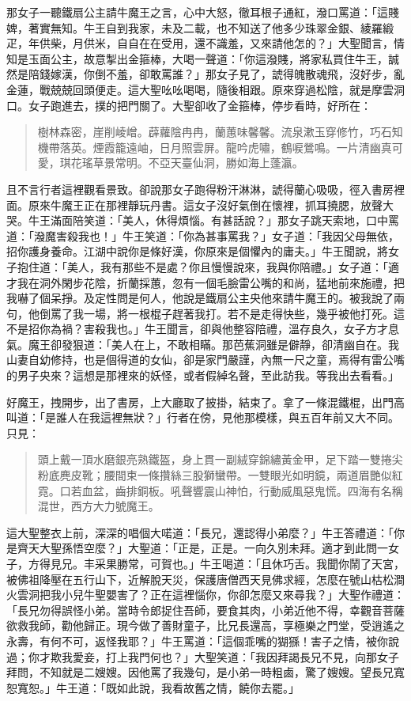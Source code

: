 那女子一聽鐵扇公主請牛魔王之言，心中大怒，徹耳根子通紅，潑口罵道：「這賤婢，著實無知。牛王自到我家，未及二載，也不知送了他多少珠翠金銀、綾羅緞疋，年供柴，月供米，自自在在受用，還不識羞，又來請他怎的？」大聖聞言，情知是玉面公主，故意掣出金箍棒，大喝一聲道：「你這潑賤，將家私買住牛王，誠然是陪錢嫁漢，你倒不羞，卻敢罵誰？」那女子見了，諕得魄散魂飛，沒好步，亂金蓮，戰兢兢回頭便走。這大聖吆吆喝喝，隨後相跟。原來穿過松陰，就是摩雲洞口。女子跑進去，撲的把門關了。大聖卻收了金箍棒，停步看時，好所在：
\begin{quote}
樹林森密，崖削崚嶒。薜蘿陰冉冉，蘭蕙味馨馨。流泉漱玉穿修竹，巧石知機帶落英。煙霞籠遠岫，日月照雲屏。龍吟虎嘯，鶴唳鶯鳴。一片清幽真可愛，琪花瑤草景常明。不亞天臺仙洞，勝如海上蓬瀛。
\end{quote}

且不言行者這裡觀看景致。卻說那女子跑得粉汗淋淋，諕得蘭心吸吸，徑入書房裡面。原來牛魔王正在那裡靜玩丹書。這女子沒好氣倒在懷裡，抓耳撓腮，放聲大哭。牛王滿面陪笑道：「美人，休得煩惱。有甚話說？」那女子跳天索地，口中罵道：「潑魔害殺我也！」牛王笑道：「你為甚事罵我？」女子道：「我因父母無依，招你護身養命。江湖中說你是條好漢，你原來是個懼內的庸夫。」牛王聞說，將女子抱住道：「美人，我有那些不是處？你且慢慢說來，我與你陪禮。」女子道：「適才我在洞外閑步花陰，折蘭採蕙，忽有一個毛臉雷公嘴的和尚，猛地前來施禮，把我嚇了個呆掙。及定性問是何人，他說是鐵扇公主央他來請牛魔王的。被我說了兩句，他倒罵了我一場，將一根棍子趕著我打。若不是走得快些，幾乎被他打死。這不是招你為禍？害殺我也。」牛王聞言，卻與他整容陪禮，溫存良久，女子方才息氣。魔王卻發狠道：「美人在上，不敢相瞞。那芭蕉洞雖是僻靜，卻清幽自在。我山妻自幼修持，也是個得道的女仙，卻是家門嚴謹，內無一尺之童，焉得有雷公嘴的男子央來？這想是那裡來的妖怪，或者假綽名聲，至此訪我。等我出去看看。」

好魔王，拽開步，出了書房，上大廳取了披掛，結束了。拿了一條混鐵棍，出門高叫道：「是誰人在我這裡無狀？」行者在傍，見他那模樣，與五百年前又大不同。只見：
\begin{quote}
頭上戴一頂水磨銀亮熟鐵盔，身上貫一副絨穿錦繡黃金甲，足下踏一雙捲尖粉底麂皮靴；腰間束一條攢絲三股獅蠻帶。一雙眼光如明鏡，兩道眉艷似紅霓。口若血盆，齒排銅板。吼聲響震山神怕，行動威風惡鬼慌。四海有名稱混世，西方大力號魔王。
\end{quote}

這大聖整衣上前，深深的唱個大喏道：「長兄，還認得小弟麼？」牛王答禮道：「你是齊天大聖孫悟空麼？」大聖道：「正是，正是。一向久別未拜。適才到此問一女子，方得見兄。丰采果勝常，可賀也。」牛王喝道：「且休巧舌。我聞你鬧了天宮，被佛祖降壓在五行山下，近解脫天災，保護唐僧西天見佛求經，怎麼在號山枯松澗火雲洞把我小兒牛聖嬰害了？正在這裡惱你，你卻怎麼又來尋我？」大聖作禮道：「長兄勿得誤怪小弟。當時令郎捉住吾師，要食其肉，小弟近他不得，幸觀音菩薩欲救我師，勸他歸正。現今做了善財童子，比兄長還高，享極樂之門堂，受逍遙之永壽，有何不可，返怪我耶？」牛王罵道：「這個乖嘴的猢猻！害子之情，被你說過；你才欺我愛妾，打上我門何也？」大聖笑道：「我因拜謁長兄不見，向那女子拜問，不知就是二嫂嫂。因他罵了我幾句，是小弟一時粗鹵，驚了嫂嫂。望長兄寬恕寬恕。」牛王道：「既如此說，我看故舊之情，饒你去罷。」

